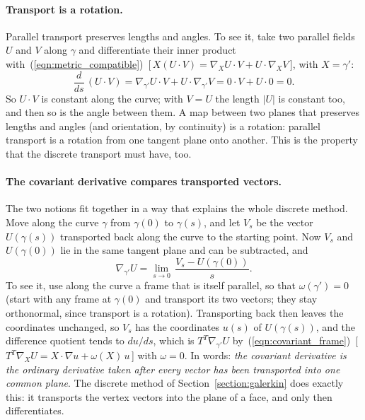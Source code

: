 \paragraph{Transport is a rotation.} Parallel transport preserves lengths and angles. To see it, take two parallel fields $U$ and $V$ along $\gamma$ and differentiate their inner product with~(\ref{eqn:metric_compatible})~[\,$X(U\cdot V) = \nabla_X U \cdot V + U\cdot\nabla_X V$\,], with $X = \gamma'$:
\begin{equation*}
\frac{d}{ds}\, (U \cdot V) = \nabla_{\gamma'} U \cdot V + U \cdot \nabla_{\gamma'} V = 0 \cdot V + U \cdot 0 = 0 .
\end{equation*}
So $U\cdot V$ is constant along the curve; with $V = U$ the length $|U|$ is constant too, and then so is the angle between them. A map between two planes that preserves lengths and angles (and orientation, by continuity) is a rotation: parallel transport is a rotation from one tangent plane onto another. This is the property that the discrete transport must have, too.

\paragraph{The covariant derivative compares transported vectors.} The two notions fit together in a way that explains the whole discrete method. Move along the curve $\gamma$ from $\gamma(0)$ to $\gamma(s)$, and let $V_s$ be the vector $U(\gamma(s))$ transported back along the curve to the starting point. Now $V_s$ and $U(\gamma(0))$ lie in the same tangent plane and can be subtracted, and
\begin{equation*}
\nabla_{\gamma'} U = \lim_{s\to 0}\, \frac{V_s - U(\gamma(0))}{s} .
\end{equation*}
To see it, use along the curve a frame that is itself parallel, so that $\omega(\gamma') = 0$ (start with any frame at $\gamma(0)$ and transport its two vectors; they stay orthonormal, since transport is a rotation). Transporting back then leaves the coordinates unchanged, so $V_s$ has the coordinates $u(s)$ of $U(\gamma(s))$, and the difference quotient tends to $du/ds$, which is $T^T\nabla_{\gamma'} U$ by~(\ref{eqn:covariant_frame})~[\,$T^T\nabla_XU = X\cdot\nabla u + \omega(X)\,u$\,] with $\omega = 0$. In words: \emph{the covariant derivative is the ordinary derivative taken after every vector has been transported into one common plane}. The discrete method of Section~\ref{section:galerkin} does exactly this: it transports the vertex vectors into the plane of a face, and only then differentiates.

